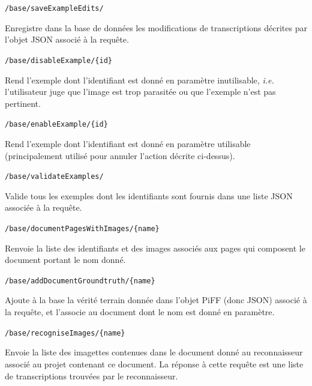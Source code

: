 \begin{description}[align=left]
\item [POST] \texttt{/base/saveExampleEdits/}\newline{}
\begin{itshape}
Enregistre dans la base de données les modifications de transcriptions décrites par l'objet JSON associé à la requête.
\end{itshape}

\item [PUT] \texttt{/base/disableExample/\{id\}}\newline{}
\begin{itshape}
Rend l'exemple dont l'identifiant est donné en paramètre inutilisable, \textit{i.e.} l'utilisateur juge que l'image est trop parasitée ou que l'exemple n'est pas pertinent.
\end{itshape}

\item [PUT] \texttt{/base/enableExample/\{id\}}\newline{}
\begin{itshape}
Rend l'exemple dont l'identifiant est donné en paramètre utilisable (principalement utilisé pour annuler l'action décrite ci-dessus).
\end{itshape}

\item [POST] \texttt{/base/validateExamples/}\newline{}
\begin{itshape}
Valide tous les exemples dont les identifiants sont fournis dans une liste JSON associée à la requête.
\end{itshape}

\item [Découpe]

\item [GET] \texttt{/base/documentPagesWithImages/\{name\}}\newline{}
\begin{itshape}
Renvoie la liste des identifiants et des images associés aux pages qui composent le document portant le nom donné.
\end{itshape}

\item [POST] \texttt{/base/addDocumentGroundtruth/\{name\}}\newline{}
\begin{itshape}
Ajoute à la base la vérité terrain donnée dans l'objet PiFF (donc JSON) associé à la requête, et l'associe au document dont le nom est donné en paramètre.
\end{itshape}

\item [GET] \texttt{/base/recogniseImages/\{name\}}\newline{}
\begin{itshape}
Envoie la liste des imagettes contenues dans le document donné au reconnaisseur associé au projet contenant ce document. La réponse à cette requête est une liste de transcriptions trouvées par le reconnaisseur.
\end{itshape}

\end{description}